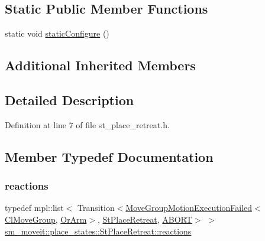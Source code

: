 \subsection*{Static Public Member Functions}
\begin{DoxyCompactItemize}
\item 
static void \hyperlink{structsm__moveit_1_1place__states_1_1StPlaceRetreat_a6f2a55cf2350568bf054c20eb9a59c94}{static\+Configure} ()
\end{DoxyCompactItemize}
\subsection*{Additional Inherited Members}


\subsection{Detailed Description}


Definition at line 7 of file st\+\_\+place\+\_\+retreat.\+h.



\subsection{Member Typedef Documentation}
\mbox{\label{structsm__moveit_1_1place__states_1_1StPlaceRetreat_a63015ae143e5815bb2c3fb4a2f3dc16d}} 
\subsubsection{\texorpdfstring{reactions}{reactions}}
{\footnotesize\ttfamily typedef mpl\+::list$<$ Transition$<$\hyperlink{structmoveit__z__client_1_1MoveGroupMotionExecutionFailed}{Move\+Group\+Motion\+Execution\+Failed}$<$\hyperlink{classmoveit__z__client_1_1ClMoveGroup}{Cl\+Move\+Group}, \hyperlink{classsm__moveit_1_1OrArm}{Or\+Arm}$>$, \hyperlink{structsm__moveit_1_1place__states_1_1StPlaceRetreat}{St\+Place\+Retreat}, \hyperlink{classABORT}{A\+B\+O\+RT}$>$ $>$ \hyperlink{structsm__moveit_1_1place__states_1_1StPlaceRetreat_a63015ae143e5815bb2c3fb4a2f3dc16d}{sm\+\_\+moveit\+::place\+\_\+states\+::\+St\+Place\+Retreat\+::reactions}}




